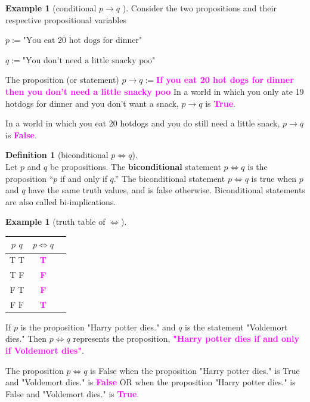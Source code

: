 \documentclass[letterpaper,10pt]{article}
\theoremstyle{plain}
\theoremstyle{definition}
\newtheorem{defn}[thm]{Definition}
\newtheorem{exmp}[thm]{Example}
\theoremstyle{remark}
\providecommand{\todo}[1]{\textcolor{magenta}{\textbf{#1}}}
\begin{document}
\newpage

\begin{exmp}[conditional $p\to q$ ] \hspace{\fill}

Consider the two propositions and their respective propositional variables

$ p:=\text{"You eat 20 hot dogs for dinner"} $

$ q:=\text{"You don't need a little snacky poo"} $

The proposition (or statement)
\newline
$p\to q:= $\todo{If you eat 20 hot dogs for dinner then you don't need a little snacky poo }
\newline
In a world in which you only ate 19 hotdogs for dinner and you don't want a snack, $p\to q$ is \todo{True}.

In a world in which you eat 20 hotdogs and you do still need a little snack, $p \to q$ is \todo{False}.

\end{exmp}

\begin{defn}[biconditional $p\iff q$]\ \\
Let $p$ and $q$ be propositions. The \textbf{biconditional} statement $p \iff q$ is the proposition “$p$ if
and only if $q$.” The biconditional statement $p \iff q$ is true when $p$ and $q$ have the same truth
values, and is false otherwise. Biconditional statements are also called bi-implications.
\end{defn}

\begin{exmp}[truth table of $\iff$]
\begin{center}
\begin{tabular}{ | c | c | c |} 
  \hline
 $p$ $q$ & $ p \iff q$ \\
 \hline
  T T & \todo{T} \\ 
  T F & \todo{F} \\ 
  F T & \todo{F} \\ 
  F F & \todo{T} \\ 
  \hline
\end{tabular}
\end{center}
If $p$ is the proposition "Harry potter dies." and $q$ is the statement "Voldemort dies." Then $p \iff q$ represents the proposition, \todo{"Harry potter dies if and only if Voldemort dies"}.

The proposition $p\iff q$ is False when the proposition "Harry potter dies." is True and "Voldemort dies." is \todo{False} OR when the proposition "Harry potter dies." is False and "Voldemort dies." is \todo{True}.

\end{exmp}
\end{document}
